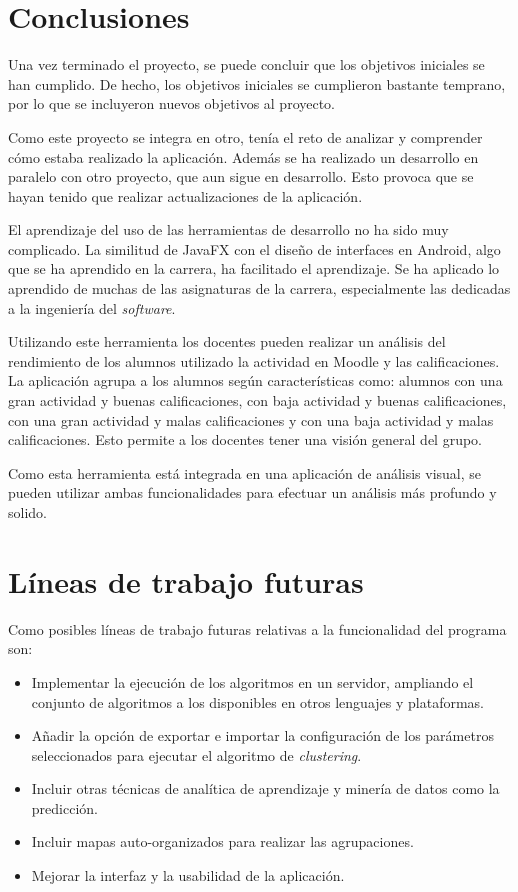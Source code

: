 
\section{Conclusiones}
Una vez terminado el proyecto, se puede concluir que los objetivos iniciales se han cumplido. De hecho, los objetivos iniciales se cumplieron bastante temprano, por lo que se incluyeron nuevos objetivos al proyecto.

Como este proyecto se integra en otro, tenía el reto de analizar y comprender cómo estaba realizado la aplicación. Además se ha realizado un desarrollo en paralelo con otro proyecto, que aun sigue en desarrollo. Esto provoca que se hayan tenido que realizar actualizaciones de la aplicación.

El aprendizaje del uso de las herramientas de desarrollo no ha sido muy complicado. La similitud de JavaFX con el diseño de interfaces en Android, algo que se ha aprendido en la carrera, ha facilitado el aprendizaje. Se ha aplicado lo aprendido de muchas de las asignaturas de la carrera, especialmente las dedicadas a la ingeniería del \emph{software}.

Utilizando este herramienta los docentes pueden realizar un análisis del rendimiento de los alumnos utilizado la actividad en Moodle y las calificaciones. La aplicación agrupa a los alumnos según características como: alumnos con una gran actividad y buenas calificaciones, con baja actividad y buenas calificaciones, con una gran actividad y malas calificaciones y con una baja actividad y malas calificaciones. Esto permite a los docentes tener una visión general del grupo.

Como esta herramienta está integrada en una aplicación de análisis visual, se pueden utilizar ambas funcionalidades para efectuar un análisis más profundo y solido. 

\section{Líneas de trabajo futuras}
Como posibles líneas de trabajo futuras relativas a la funcionalidad del programa son:
\begin{itemize}
	\item Implementar la ejecución de los algoritmos en un servidor, ampliando el conjunto de algoritmos a los disponibles en otros lenguajes y plataformas.
	\item Añadir la opción de exportar e importar la configuración de los parámetros seleccionados para ejecutar el algoritmo de \emph{clustering}.
	\item Incluir otras técnicas de analítica de aprendizaje y minería de datos como la predicción.
	\item Incluir mapas auto-organizados para realizar las agrupaciones.
	\item Mejorar la interfaz y la usabilidad de la aplicación.
\end{itemize}